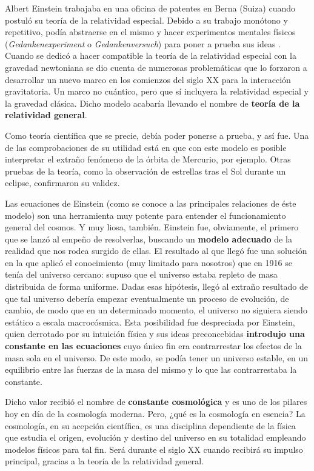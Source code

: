\documentclass[11pt,a4paper,titlepage]{article}
\begin{document}
Albert Einstein trabajaba en una oficina de patentes en Berna (Suiza) cuando postuló su teoría de la relatividad especial. Debido a su trabajo monótono y repetitivo, podía abstraerse en el mismo y hacer experimentos mentales físicos (\textit{Gedankenexperiment} o \textit{Gedankenversuch}) para poner a prueba sus ideas . Cuando se dedicó a hacer compatible la teoría de la relatividad especial con la gravedad newtoniana se dio cuenta de numerosas problemáticas que lo forzaron a desarrollar un nuevo marco en los comienzos del siglo XX para la interacción gravitatoria. Un marco no cuántico, pero que sí incluyera la relatividad especial y la gravedad clásica. Dicho modelo acabaría llevando el nombre de \textbf{teoría de la relatividad general}.

Como teoría científica que se precie, debía poder ponerse a prueba, y así fue. Una de las comprobaciones de su utilidad está en que con este modelo es posible interpretar el extraño fenómeno de la órbita de Mercurio, por ejemplo. Otras pruebas de la teoría, como la observación de estrellas tras el Sol durante un eclipse, confirmaron su validez.


Las ecuaciones de Einstein (como se conoce a las principales relaciones de éste modelo) son una herramienta muy potente para entender el funcionamiento general del cosmos. Y muy liosa, también. Einstein fue, obviamente, el primero que se lanzó al empeño de resolverlas, buscando un \textbf{modelo adecuado} de la realidad que nos rodea surgido de ellas. El resultado al que llegó fue una solución en la que aplicó el conocimiento (muy limitado para nosotros) que en 1916 se tenía del universo cercano: supuso que el universo estaba repleto de masa distribuida de forma uniforme. Dadas esas hipótesis, llegó al extraño resultado de que tal universo debería empezar eventualmente un proceso de evolución, de cambio, de modo que en un determinado momento, el universo no siguiera siendo estático a escala macrocósmica. Esta posibilidad fue despreciada por Einstein, quien derrotado por su intuición física y sus ideas preconcebidas \textbf{introdujo una constante en las ecuaciones} cuyo único fin era contrarrestar los efectos de la masa sola en el universo. De este modo, se podía tener un universo estable, en un equilibrio entre las fuerzas de la masa del mismo y lo que las contrarrestaba la constante.

Dicho valor recibió el nombre de \textbf{constante cosmológica} y es uno de los pilares hoy en día de la cosmología moderna. Pero, ¿qué es la cosmología en esencia? La cosmología, en su acepción científica, es una disciplina dependiente de la física que estudia el origen, evolución y destino del universo en su totalidad empleando modelos físicos para tal fin. Será durante el siglo XX cuando recibirá su impulso principal, gracias a la teoría de la relatividad general.
\end{document}
